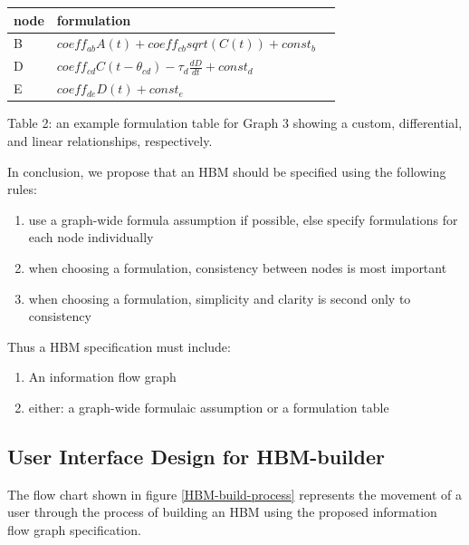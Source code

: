 \documentclass[runningheads,a4paper]{llncs}
\begin{document}
\begin{centering}
  \begin{tabular}{ | l | l | l |}
      \hline
      node & formulation \\ \hline
      B & $coeff_{ab}A(t) + coeff_{cb}sqrt(C(t)) + const_b$ \\ \hline
      D & $coeff_{cd}C(t-\theta_{cd}) - \tau_{d}\frac{dD}{dt} + const_{d}$ \\ \hline
      E & $coeff_{de}D(t) + const_{e}$ \\ \hline
  \end{tabular}

  Table 2: an example formulation table for Graph 3 showing a custom, differential, and linear relationships, respectively.
\end{centering}

In conclusion, we propose that an HBM should be specified using the following rules:

\begin{enumerate}
  \item use a graph-wide formula assumption if possible, else specify formulations for each node individually
  \item when choosing a formulation, consistency between nodes is most important
  \item when choosing a formulation, simplicity and clarity is second only to consistency
\end{enumerate}
  
Thus a HBM specification must include:
\begin{enumerate}
  \item An information flow graph
  \item either: a graph-wide formulaic assumption or a formulation table 
\end{enumerate}

\subsection{User Interface Design for HBM-builder }
The flow chart shown in figure \ref{HBM-build-process} represents the movement of a user through the process of building an HBM using the proposed information flow graph specification.
\end{document}
